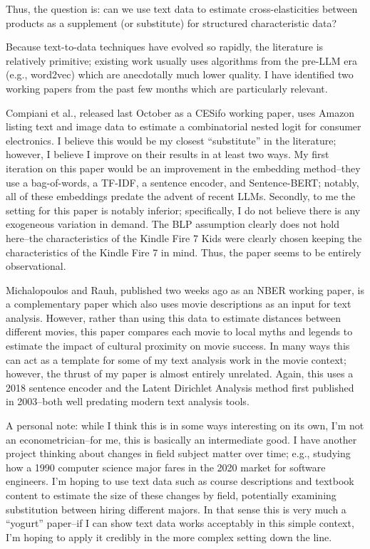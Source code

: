 \documentclass{article}
\begin{document}
Thus, the question is: can we use text data to estimate cross-elasticities between products as a supplement (or substitute) for structured characteristic data?

Because text-to-data techniques have evolved so rapidly, the literature is relatively primitive; existing work usually uses algorithms from the pre-LLM era (e.g., word2vec) which are anecdotally much lower quality. I have identified two working papers from the past few months which are particularly relevant. 

Compiani et al., released last October as a CESifo working paper, uses Amazon listing text and image data to estimate a combinatorial nested logit for consumer electronics. I believe this would be my closest ``substitute'' in the literature; however, I believe I improve on their results in at least two ways. My first iteration on this paper would be an improvement in the embedding method--they use a bag-of-words, a TF-IDF, a sentence encoder, and Sentence-BERT; notably, all of these embeddings predate the advent of recent LLMs. Secondly, to me the setting for this paper is notably inferior; specifically, I do not believe there is any exogeneous variation in demand. The BLP assumption clearly does not hold here--the characteristics of the Kindle Fire 7 Kids were clearly chosen keeping the characteristics of the Kindle Fire 7 in mind. Thus, the paper seems to be entirely observational. 

Michalopoulos and Rauh, published two weeks ago as an NBER working paper, is a complementary paper which also uses movie descriptions as an input for text analysis. However, rather than using this data to estimate distances between different movies, this paper compares each movie to local myths and legends to estimate the impact of cultural proximity on movie success. In many ways this can act as a template for some of my text analysis work in the movie context; however, the thrust of my paper is almost entirely unrelated. Again, this uses a 2018 sentence encoder and the Latent Dirichlet Analysis method first published in 2003--both well predating modern text analysis tools. 

A personal note: while I think this is in some ways interesting on its own, I'm not an econometrician--for me, this is basically an intermediate good. I have another project thinking about changes in field subject matter over time; e.g., studying how a 1990 computer science major fares in the 2020 market for software engineers. I'm hoping to use text data such as course descriptions and textbook content to estimate the size of these changes by field, potentially examining substitution between hiring different majors. In that sense this is very much a ``yogurt'' paper--if I can show text data works acceptably in this simple context, I'm hoping to apply it credibly in the more complex setting down the line.
\end{document}
